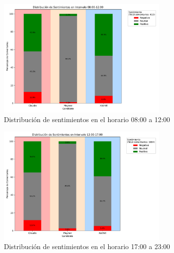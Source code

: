 \documentclass[10pt, a4paper]{article}
\begin{document}
	\begin{figure}[h!] %
		\centering
		\includegraphics[width=0.75\textwidth]{sA_intervalo_0812.pdf} %
		\caption{Distribución de sentimientos en el horario 08:00 a 12:00} %
		\label{fig:sA_08a12} %
	\end{figure}
	
	\begin{figure}[h!] %
		\centering
		\includegraphics[width=0.75\textwidth]{sA_intervalo_1217.pdf} %
		\caption{Distribución de sentimientos en el horario 17:00 a 23:00} %
		\label{fig:sA_12a17} %
	\end{figure}
	
\end{document}
